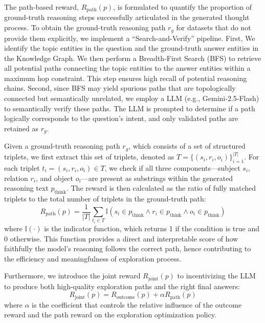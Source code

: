 The path-based reward, $R_{\text{path}}(p)$, is formulated to quantify the proportion of ground-truth reasoning steps successfully articulated in the generated thought process.
To obtain the ground-truth reasoning path $r_g$ for datasets that do not provide them explicitly, we implement a ``Search-and-Verify'' pipeline. 
First, We identify the topic entities in the question and the ground-truth answer entities in the Knowledge Graph. 
We then perform a Breadth-First Search (BFS) to retrieve all potential paths connecting the topic entities to the answer entities within a maximum hop constraint. 
This step ensures high recall of potential reasoning chains.
Second, since BFS may yield spurious paths that are topologically connected but semantically unrelated, we employ a LLM (e.g., Gemini-2.5-Flash) to semantically verify these paths. 
The LLM is prompted to determine if a path logically corresponds to the question's intent, and only validated paths are retained as $r_g$.

Given a ground-truth reasoning path $r_g$, which consists of a set of structured triplets, we first extract this set of triplets, denoted as $T = \{ (s_i, r_i, o_i) \}_{i=1}^{|T|}$. 
For each triplet $t_i = (s_i, r_i, o_i) \in T$, we check if all three components—subject $s_i$, relation $r_i$, and object $o_i$—are present as substrings within the generated reasoning text $p_{\text{think}}$.
The reward is then calculated as the ratio of fully matched triplets to the total number of triplets in the ground-truth path: \begin{equation} R_{\text{path}}(p) = \frac{1}{|T|} \sum_{t_i \in T} \mathbb{I}(s_i \in p_{\text{think}} \land r_i \in p_{\text{think}} \land o_i \in p_{\text{think}}) \end{equation} where $\mathbb{I}(\cdot)$ is the indicator function, which returns 1 if the condition is true and 0 otherwise.
This function provides a direct and interpretable score of how faithfully the model's reasoning follows the correct path, hence contributing to the efficiency and meaningfulness of exploration process.

Furthermore, we introduce the joint reward $R_{\text{joint}}(p)$ to incentivizing the LLM to produce both high-quality exploration paths and the right final answers:
\begin{equation} \label{eq:jointreward}
R_{\text{joint}}(p) =  R_{\textrm{outcome}}(p) + \alpha  R_{\textrm{path}}(p)
\end{equation} 
where $\alpha$ is the coefficient that controls the relative influence of the outcome reward and the path reward on the exploration optimization policy.

